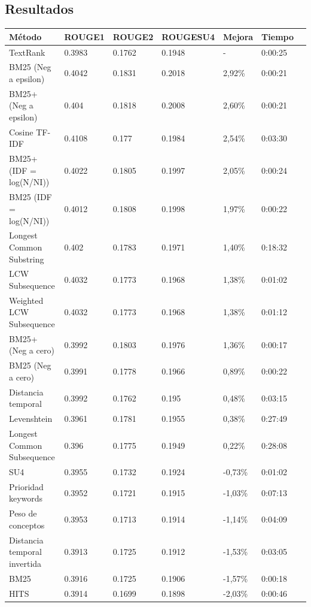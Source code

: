 \documentclass[a4paper]{article}
\begin{document}
\subsection{Resultados}
\begin{tabular}{ | l | l | l | l | l | l | l | }
\hline
	Método & ROUGE1 & ROUGE2 & ROUGESU4 & Mejora & Tiempo\\ \hline
	TextRank & 0.3983 & 0.1762 & 0.1948 & - & 0:00:25\\ \hline
	BM25 (Neg a epsilon) & 0.4042 & 0.1831 & 0.2018 & 2,92\% & 0:00:21\\ \hline
	BM25+ (Neg a epsilon) & 0.404 & 0.1818 & 0.2008 & 2,60\% & 0:00:21\\ \hline
	Cosine TF-IDF & 0.4108 & 0.177 & 0.1984 & 2,54\% & 0:03:30\\ \hline
	BM25+ (IDF = log(N/NI)) & 0.4022 & 0.1805 & 0.1997 & 2,05\% & 0:00:24\\ \hline
	BM25 (IDF = log(N/NI)) & 0.4012 & 0.1808 & 0.1998 & 1,97\% & 0:00:22\\ \hline
	Longest Common Substring & 0.402 & 0.1783 & 0.1971 & 1,40\% & 0:18:32\\ \hline
	LCW Subsequence & 0.4032 & 0.1773 & 0.1968 & 1,38\% & 0:01:02\\ \hline
	Weighted LCW Subsequence & 0.4032 & 0.1773 & 0.1968 & 1,38\% & 0:01:12\\ \hline
	BM25+ (Neg a cero) & 0.3992 & 0.1803 & 0.1976 & 1,36\% & 0:00:17\\ \hline
	BM25 (Neg a cero) & 0.3991 & 0.1778 & 0.1966 & 0,89\% & 0:00:22\\ \hline
	Distancia temporal & 0.3992 & 0.1762 & 0.195 & 0,48\% & 0:03:15\\ \hline
	Levenshtein & 0.3961 & 0.1781 & 0.1955 & 0,38\% & 0:27:49\\ \hline
	Longest Common Subsequence & 0.396 & 0.1775 & 0.1949 & 0,22\% & 0:28:08\\ \hline
	SU4 & 0.3955 & 0.1732 & 0.1924 & -0,73\% & 0:01:02\\ \hline
	Prioridad keywords & 0.3952 & 0.1721 & 0.1915 & -1,03\% & 0:07:13\\ \hline
	Peso de conceptos & 0.3953 & 0.1713 & 0.1914 & -1,14\% & 0:04:09\\ \hline
	Distancia temporal invertida & 0.3913 & 0.1725 & 0.1912 & -1,53\% & 0:03:05\\ \hline
	BM25 & 0.3916 & 0.1725 & 0.1906 & -1,57\% & 0:00:18\\ \hline
	HITS & 0.3914 & 0.1699 & 0.1898 & -2,03\% & 0:00:46\\ \hline

\end{tabular}
\end{document}
